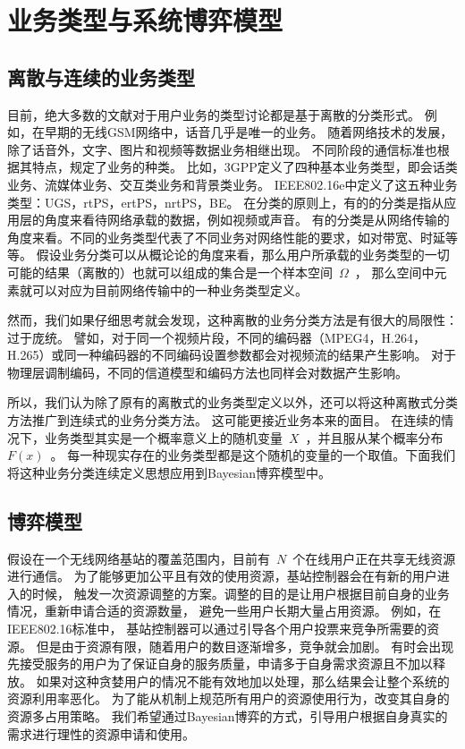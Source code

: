\section{业务类型与系统博弈模型}
\subsection{离散与连续的业务类型}
目前，绝大多数的文献对于用户业务的类型讨论都是基于离散的分类形式。
例如，在早期的无线GSM网络中，话音几乎是唯一的业务。
随着网络技术的发展，除了话音外，文字、图片和视频等数据业务相继出现。
不同阶段的通信标准也根据其特点，规定了业务的种类。
比如，3GPP定义了四种基本业务类型，即会话类业务、流媒体业务、交互类业务和背景类业务。
IEEE802.16e中定义了这五种业务类型：UGS，rtPS，ertPS，nrtPS，BE。
在分类的原则上，有的的分类是指从应用层的角度来看待网络承载的数据，例如视频或声音。
有的分类是从网络传输的角度来看。不同的业务类型代表了不同业务对网络性能的要求，如对带宽、时延等等。
假设业务分类可以从概论论的角度来看，那么用户所承载的业务类型的一切可能的结果（离散的）也就可以组成的集合是一个样本空间~$\Omega$~，
那么空间中元素就可以对应为目前网络传输中的一种业务类型定义。

然而，我们如果仔细思考就会发现，这种离散的业务分类方法是有很大的局限性：过于庞统。
譬如，对于同一个视频片段，不同的编码器（MPEG4，H.264，H.265）或同一种编码器的不同编码设置参数都会对视频流的结果产生影响。
对于物理层调制编码，不同的信道模型和编码方法也同样会对数据产生影响。

所以，我们认为除了原有的离散式的业务类型定义以外，还可以将这种离散式分类方法推广到连续式的业务分类方法。
这可能更接近业务本来的面目。
在连续的情况下，业务类型其实是一个概率意义上的随机变量~$X$~，并且服从某个概率分布~$F(x)$~。
每一种现实存在的业务类型都是这个随机的变量的一个取值。下面我们将这种业务分类连续定义思想应用到Bayesian博弈模型中。

\subsection{博弈模型}
假设在一个无线网络基站的覆盖范围内，目前有~$N$~个在线用户正在共享无线资源进行通信。
为了能够更加公平且有效的使用资源，基站控制器会在有新的用户进入的时候，
触发一次资源调整的方案。调整的目的是让用户根据目前自身的业务情况，重新申请合适的资源数量，
避免一些用户长期大量占用资源。
例如，在IEEE802.16标准中，
基站控制器可以通过引导各个用户投票来竞争所需要的资源。
但是由于资源有限，随着用户的数目逐渐增多，竞争就会加剧。
有时会出现先接受服务的用户为了保证自身的服务质量，申请多于自身需求资源且不加以释放。
如果对这种贪婪用户的情况不能有效地加以处理，那么结果会让整个系统的资源利用率恶化。
为了能从机制上规范所有用户的资源使用行为，改变其自身的资源多占用策略。
我们希望通过Bayesian博弈的方式，引导用户根据自身真实的需求进行理性的资源申请和使用。

